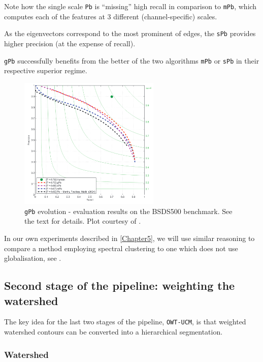 Note how the single scale {\tt Pb} is ``missing'' high recall in comparison to {\tt mPb}, which computes each of the features at 3 different (channel-specific) scales. 

As the eigenvectors correspond to the most prominent of edges, the {\tt sPb} provides %
higher precision (at the expense of recall). 

{\tt gPb} successfully benefits from the better of the two algorithms {\tt mPb} or {\tt sPb} in their respective superior regime.

\begin{figure}[t]
 \centering
 \includegraphics[width=0.6\textwidth]{images/gPb-OWT-UCM/Pb_mPb_sPb_gPb.png}
 \caption[{\tt gPb} evolution - plot results on the BSDS500 benchmark.]{{\tt gPb} evolution - evaluation results on the BSDS500 benchmark. See the text for details. Plot courtesy of \cite{Arbelaez11}.}
 \label{fig:Pb_mPb_sPb_gPb}
\end{figure}

In our own experiments described in \cref{Chapter5}, we will use similar reasoning to compare a method employing spectral clustering to one which does not use globalisation, see .

\subsection{Second stage of the pipeline: weighting the watershed} %
The key idea for the last two stages %
of the pipeline, {\tt OWT-UCM}, is that weighted watershed contours can be converted into a hierarchical segmentation.

\subsubsection{Watershed}
\label{sec:ch3-watershed}

